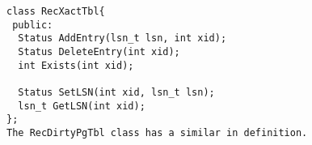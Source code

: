 \newpage

{\samepage \clearpage \begin{figure} \label{fig:dat}
\begin{verbatim}class RecXactTbl{   
 public: 
  Status AddEntry(lsn_t lsn, int xid);
  Status DeleteEntry(int xid);       
  int Exists(int xid);              

  Status SetLSN(int xid, lsn_t lsn);
  lsn_t GetLSN(int xid);
};
The RecDirtyPgTbl class has a similar in definition.\end{verbatim}
 
\end{figure}
}




